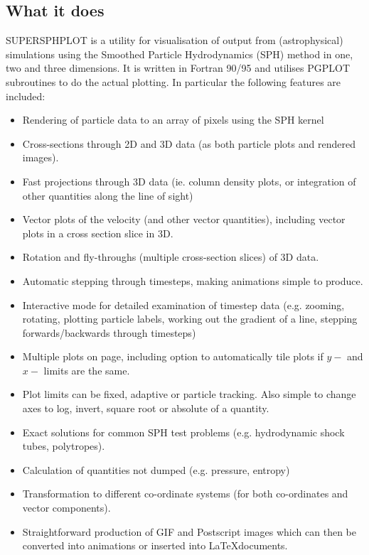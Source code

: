 \documentclass[a4paper,12pt]{article}
\begin{document}
\subsection{What it does}
SUPERSPHPLOT is a utility for visualisation of output from (astrophysical) simulations using the
Smoothed Particle Hydrodynamics (SPH) method in one, two and three dimensions.
It is written in Fortran 90/95 and
utilises PGPLOT subroutines to do the actual plotting. In particular the following
features are included:
\begin{itemize}
\item Rendering of particle data to an array of pixels using the SPH kernel
\item Cross-sections through 2D and 3D data (as both particle plots and rendered
images).
\item Fast projections through 3D data (ie. column density plots, or integration of
other quantities along the line of sight)
\item Vector plots of the velocity (and other vector quantities), including vector
plots in a cross section slice in 3D.
\item Rotation and fly-throughs (multiple cross-section slices) of 3D data.
\item Automatic stepping through timesteps, making animations simple to produce.
\item Interactive mode for detailed examination of timestep data (e.g. zooming,
rotating, plotting particle labels, working out the gradient of a line, stepping forwards/backwards
through timesteps)
\item Multiple plots on page, including option to automatically tile plots if $y-$ and $x-$ limits
are the same.
\item Plot limits can be fixed, adaptive or particle tracking. Also simple to change
axes to log, invert, square root or absolute of a quantity.
\item Exact solutions for common SPH test problems (e.g. hydrodynamic shock tubes,
polytropes).
\item Calculation of quantities not dumped (e.g. pressure, entropy)
\item Transformation to different co-ordinate systems (for both co-ordinates and
vector components).
\item Straightforward production of GIF and Postscript images which can then be
converted into animations or inserted into \LaTeX documents.
\end{itemize}
\end{document}
